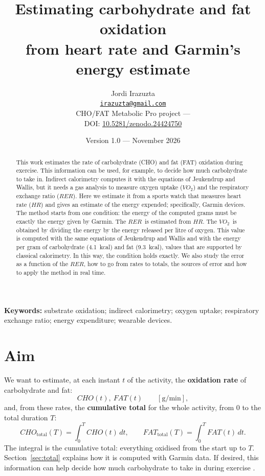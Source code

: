 \documentclass[10pt,a4paper]{article}
\title{\textbf{Estimating carbohydrate and fat oxidation\\
from heart rate and Garmin's energy estimate}}
\author{Jordi Irazuzta\\
\small\href{mailto:irazuzta@gmail.com}{\texttt{irazuzta@gmail.com}}\\[4pt]
\small CHO/FAT Metabolic Pro project --- \webprojecte\\[2pt]
\small DOI: \href{https://doi.org/10.5281/zenodo.24424750}{10.5281/zenodo.24424750}}
\date{Version 1.0 --- November 2026}
\newcommand{\sub}[1]{{\scriptscriptstyle\mathrm{#1}}}   %
\newcommand{\tot}{\sub{total}}
\newcommand{\cho}{\ensuremath{\mathit{CHO}}}               %
\newcommand{\fat}{\ensuremath{\mathit{FAT}}}
\newcommand{\VO}{\ensuremath{\mathit{VO}_2}}               %
\newcommand{\RER}{\ensuremath{\mathit{RER}}}
\newcommand{\FC}{\ensuremath{\mathit{HR}}}
\begin{document}
\maketitle
{\let\thefootnote\relax{}}

\begin{abstract}
\noindent
This work estimates the rate of carbohydrate (CHO) and fat (FAT) oxidation during
exercise. This information can be used, for example, to decide how much carbohydrate to
take in. Indirect calorimetry computes it with the equations of Jeukendrup and Wallis, but
it needs a gas analysis to measure oxygen uptake (\VO) and the respiratory exchange ratio
(\RER). Here we estimate it from a sports watch that measures heart rate (\FC) and gives an
estimate of the energy expended; specifically, Garmin devices. The method starts from one
condition: the energy of the computed grams must be exactly the energy given by Garmin.
The \RER\ is estimated from \FC. The \VO\ is obtained by dividing the energy by the energy
released per litre of oxygen. This value is computed with the same equations of Jeukendrup
and Wallis and with the energy per gram of carbohydrate (4.1~kcal) and fat (9.3~kcal),
values that are supported by classical calorimetry. In this way, the condition holds
exactly. We also study the error as a function of the \RER, how to go from rates to
totals, the sources of error and how to apply the method in real time.
\end{abstract}

\noindent\textbf{Keywords:} substrate oxidation; indirect calorimetry; oxygen uptake;
respiratory exchange ratio; energy expenditure; wearable devices.

\section{Aim}\label{sec:objectiu}

We want to estimate, at each instant $t$ of the activity, the \textbf{oxidation rate} of
carbohydrate and fat:
\[
  \cho(t),\ \fat(t)\qquad[\mathrm{g/min}],
\]
and, from these rates, the \textbf{cumulative total} for the whole activity, from 0 to the
total duration $T$:
\begin{equation}
  \cho_{\tot}(T)=\int_0^T\cho(t)\,dt,\qquad
  \fat_{\tot}(T)=\int_0^T\fat(t)\,dt .
  \label{eq:totals}
\end{equation}
The integral is the cumulative total: everything oxidised from the start up to $T$.
Section~\ref{sec:total} explains how it is computed with Garmin data. If desired, this
information can help decide how much carbohydrate to take in during exercise
\citep{jeukendrup2014}.
\end{document}
